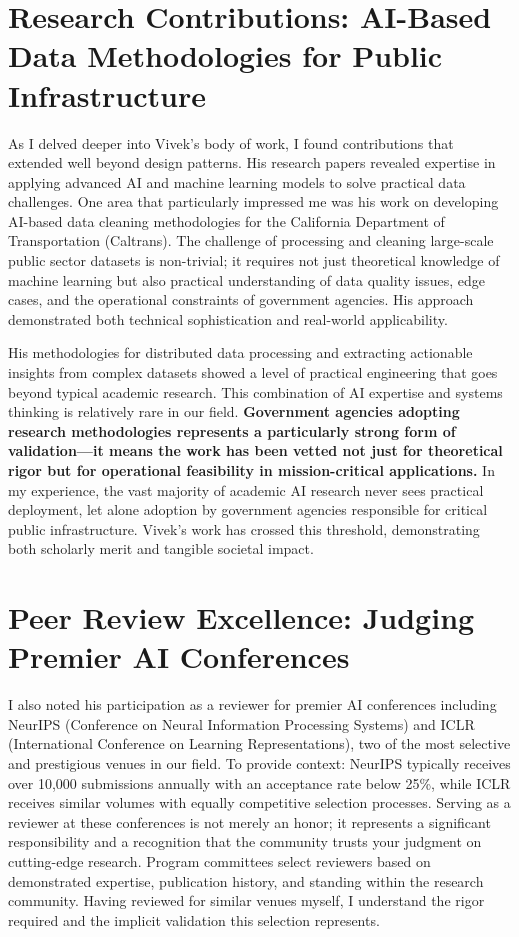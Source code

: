 \documentclass[11pt]{article}
\begin{document}
\section*{Research Contributions: AI-Based Data Methodologies for Public Infrastructure}

As I delved deeper into Vivek's body of work, I found contributions that extended well beyond design patterns. His research papers revealed expertise in applying advanced AI and machine learning models to solve practical data challenges. One area that particularly impressed me was his work on developing AI-based data cleaning methodologies for the California Department of Transportation (Caltrans). The challenge of processing and cleaning large-scale public sector datasets is non-trivial; it requires not just theoretical knowledge of machine learning but also practical understanding of data quality issues, edge cases, and the operational constraints of government agencies. His approach demonstrated both technical sophistication and real-world applicability.

His methodologies for distributed data processing and extracting actionable insights from complex datasets showed a level of practical engineering that goes beyond typical academic research. This combination of AI expertise and systems thinking is relatively rare in our field. \textbf{Government agencies adopting research methodologies represents a particularly strong form of validation---it means the work has been vetted not just for theoretical rigor but for operational feasibility in mission-critical applications.} In my experience, the vast majority of academic AI research never sees practical deployment, let alone adoption by government agencies responsible for critical public infrastructure. Vivek's work has crossed this threshold, demonstrating both scholarly merit and tangible societal impact.

\section*{Peer Review Excellence: Judging Premier AI Conferences}

I also noted his participation as a reviewer for premier AI conferences including NeurIPS (Conference on Neural Information Processing Systems) and ICLR (International Conference on Learning Representations), two of the most selective and prestigious venues in our field. To provide context: NeurIPS typically receives over 10,000 submissions annually with an acceptance rate below 25\%, while ICLR receives similar volumes with equally competitive selection processes. Serving as a reviewer at these conferences is not merely an honor; it represents a significant responsibility and a recognition that the community trusts your judgment on cutting-edge research. Program committees select reviewers based on demonstrated expertise, publication history, and standing within the research community. Having reviewed for similar venues myself, I understand the rigor required and the implicit validation this selection represents.
\end{document}
